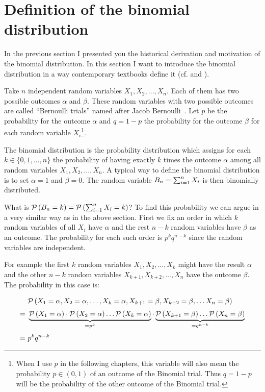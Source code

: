 \section{Definition of the binomial distribution}

In the previous section I presented you the historical derivation and motivation of the binomial distribution. In this section I want to introduce the binomial distribution in a way contemporary textbooks define it (cf. \cite[p. 33]{georgii} and \cite[pp. 57-58]{irle}).

Take $n$ independent random variables $X_1, X_2, \ldots, X_n$. Each of them has two possible outcomes $\alpha$ and $\beta$. These random variables with two possible outcomes are called ``Bernoulli trials'' named after Jacob Bernoulli~\cite[p. 32]{georgii}\cite{wiki:bernoulli_distribution}.  Let $p$ be the probability for the outcome $\alpha$ and $q=1-p$ the probability for the outcome $\beta$ for each random variable $X_i$\footnote{When I use $p$ in the following chapters, this variable will also mean the probability $p\in(0,1)$ of an outcome of the Binomial trial. Thus $q=1-p$ will be the probability of the other outcome of the Binomial trial.}.

The binomial distribution is the probability distribution which assigns for each $k\in \{0,1,\ldots,n\}$ the probability of having exactly $k$ times the outcome $\alpha$ among all random variables $X_1,X_2,\ldots,X_n$. A typical way to define the binomial distribution is to set $\alpha=1$ and $\beta=0$. The random variable $B_{n}=\sum_{i=1}^n X_i$ is then binomially distributed.

What is $\mathcal P\left({B_{n} = k}\right) = \mathcal P\left({\sum_{i=1}^n X_i=k}\right)$? To find this probability we can argue in a very similar way as in the above section. First we fix an order in which $k$ random variables of all $X_i$ have $\alpha$ and the rest $n-k$ random variables have $\beta$ as an outcome. The probability for each such order is $p^kq^{n-k}$ since the random variables are independent.

For example the first $k$ random variables $X_1,X_2,\ldots,X_k$ might have the result $\alpha$ and the other $n-k$ random variables $X_{k+1},X_{k+2},\ldots,X_n$ have the outcome $\beta$. The probability in this case is:

\begin{align}
  & \P{X_1=\alpha, X_2=\alpha, \ldots, X_k=\alpha,X_{k+1}=\beta, X_{k+2}=\beta, \ldots X_n =\beta} \nl
  =\ & \underbrace{\P{X_1=\alpha} \cdot \P{ X_2=\alpha} \ldots \P{X_k=\alpha}}_{=p^k} \cdot \underbrace{\P{X_{k+1}=\beta} \ldots \P{X_n =\beta}}_{= q^{n-k}} \nl
  =\ & p^kq^{n-k}
\end{align}

